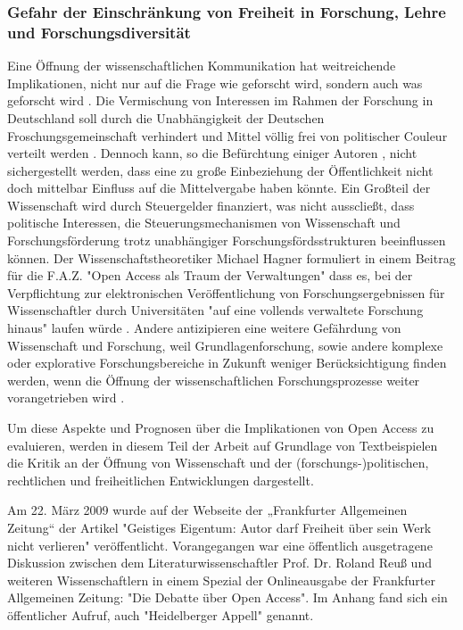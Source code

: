 \subsubsection{Gefahr der Einschränkung von Freiheit in Forschung, Lehre und Forschungsdiversität}

Eine Öffnung der wissenschaftlichen Kommunikation hat weitreichende Implikationen, nicht nur auf die Frage wie geforscht wird, sondern auch was geforscht wird \cite{suchen}. Die Vermischung von Interessen im Rahmen der Forschung in Deutschland soll durch die Unabhängigkeit der Deutschen Froschungsgemeinschaft verhindert und Mittel völlig frei von politischer Couleur verteilt werden \cite{suchen}. Dennoch kann, so die Befürchtung einiger Autoren \cite{suchen}, nicht sichergestellt werden, dass eine zu große Einbeziehung der Öffentlichkeit nicht doch mittelbar Einfluss auf die Mittelvergabe haben könnte. Ein Großteil der Wissenschaft wird durch Steuergelder finanziert, was nicht ausscließt, dass politische Interessen, die Steuerungsmechanismen von Wissenschaft und Forschungsförderung trotz unabhängiger Forschungsfördsstrukturen beeinflussen können. Der Wissenschaftstheoretiker Michael Hagner formuliert in einem Beitrag für die F.A.Z. "Open Access als Traum der Verwaltungen" dass es, bei der Verpflichtung zur elektronischen Veröffentlichung von Forschungsergebnissen für Wissenschaftler durch Universitäten "auf eine vollends verwaltete Forschung hinaus" laufen würde \cite{suchen}. Andere antizipieren eine weitere Gefährdung von Wissenschaft und Forschung, weil Grundlagenforschung, sowie andere komplexe oder explorative Forschungsbereiche in Zukunft weniger Berücksichtigung finden werden, wenn die Öffnung der wissenschaftlichen Forschungsprozesse weiter vorangetrieben wird \cite{suchen} \cite{suchen} \cite{suchen}. 

Um diese Aspekte und Prognosen über die Implikationen von Open Access zu evaluieren, werden in diesem Teil der Arbeit auf Grundlage von Textbeispielen die Kritik an der Öffnung von Wissenschaft und der (forschungs-)politischen, rechtlichen und freiheitlichen Entwicklungen dargestellt.


Am 22. März 2009 wurde auf der Webseite der „Frankfurter Allgemeinen Zeitung“ der Artikel "Geistiges Eigentum: Autor darf Freiheit über sein Werk nicht verlieren" \cite{faz_heidelberger_apell_2009} veröffentlicht. Vorangegangen war eine öffentlich ausgetragene Diskussion zwischen dem Literaturwissenschaftler Prof. Dr. Roland Reuß und weiteren Wissenschaftlern in einem Spezial der Onlineausgabe der Frankfurter Allgemeinen Zeitung: "Die Debatte über Open Access". Im Anhang fand sich ein öffentlicher Aufruf, auch "Heidelberger Appell" genannt. 

